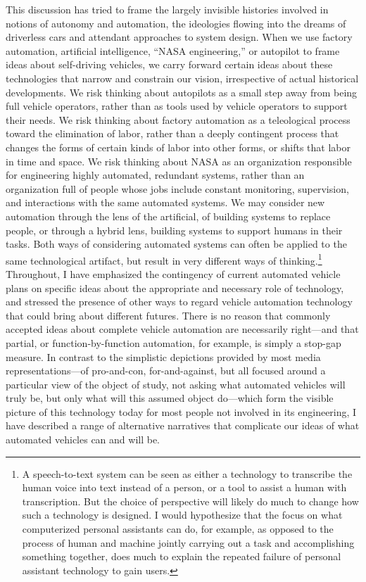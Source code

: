 This discussion has tried to frame the largely invisible histories involved in
notions of autonomy and automation, the ideologies flowing into the
dreams of driverless cars and attendant approaches to system design.
When we use factory automation, artificial intelligence, ``NASA
engineering,'' or autopilot to frame ideas about self-driving
vehicles, we carry forward certain ideas about these technologies that
narrow and constrain our vision, irrespective of actual historical
developments. We risk 
thinking about autopilots as a small step away from being full vehicle
operators, rather than as tools used by vehicle operators to support
their needs. We risk thinking about factory automation as a
teleological process toward the elimination of labor, rather than a
deeply contingent process that changes the forms of certain kinds of
labor into other forms, or shifts that labor in time and space. We
risk thinking about NASA as an organization responsible for
engineering highly automated, redundant systems, rather than an
organization full of people whose jobs include constant monitoring,
supervision, and interactions with the same automated systems. We may
consider new automation through the lens of the artificial, of
building systems to replace people, or through a hybrid lens, building
systems to support humans in their tasks. Both ways of considering
automated systems can often be applied to the same technological
artifact, but result in very different ways of thinking.\footnote{A
speech-to-text system can be seen as either a technology to transcribe 
the human voice into text instead of a person, or a tool to assist a
human with transcription. But the choice of perspective will likely do
much to change how such a technology is designed. I would hypothesize that
the focus on what computerized personal assistants can do, for
example, as opposed to the process of human and machine jointly
carrying out a task and accomplishing something together, does much to
explain the repeated failure of personal assistant technology to gain
users.}  Throughout, I have emphasized the contingency of current
automated vehicle plans on specific ideas about the appropriate and
necessary role of technology, and stressed the presence of other ways
to regard vehicle automation technology that could bring about
different futures. There is no reason that commonly accepted ideas
about complete vehicle automation are necessarily right---and that
partial, or function-by-function automation, for example, is simply a
stop-gap measure. In contrast to the simplistic depictions provided by
most media representations---of pro-and-con, for-and-against, but all
focused around a particular view of the object of study, not asking
what automated vehicles will truly be, but only what will this assumed
object do---which form the visible picture of this technology today
for most people not involved in its engineering, I have described a
range of alternative narratives that complicate our ideas of what
automated vehicles can and will be.

